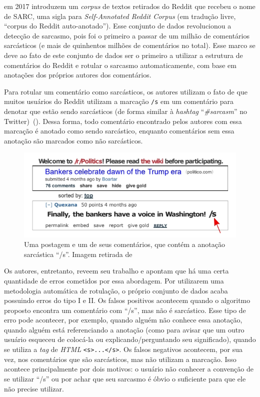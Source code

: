 \cite{khodak-etal:2017:sarc} em 2017 introduzem um \textit{corpus} de textos
retirados do Reddit que recebeu o nome de SARC, uma sigla para
\textit{Self-Annotated Reddit Corpus} (em tradução livre, ``corpus do Reddit
auto-anotado''). Esse conjunto de dados revolucionou a detecção de sarcasmo,
pois foi o primeiro a passar de um milhão de comentários sarcásticos (e mais de
quinhentos milhões de comentários no total). Esse marco se deve ao fato de este
conjunto de dados ser o primeiro a utilizar a estrutura de comentários do Reddit
e rotular o sarcasmo automaticamente, com base em anotações dos próprios autores
dos comentários.

Para rotular um comentário como sarcásticos, os autores utilizam o fato de que
muitos usuários do Reddit utilizam a marcação \texttt{/s} em um comentário para
denotar que estão sendo sarcásticos (de forma similar à \textit{hashtag}
``\textit{\#sarcasm}'' no Twitter)~(\cite{what-does-s-mean}). Dessa forma, todo
comentário encontrado pelos autores com essa marcação é anotado como sendo
sarcástico, enquanto comentários sem essa anotação são marcados como não
sarcásticos.

\begin{figure}[h]
\centering
\includegraphics[scale=0.7]{Res/sarc-img1.jpg}
\caption{Uma postagem e um de seus comentários, que contém a anotação sarcástica
``/s''. Imagem retirada de \cite{khodak-etal:2017:sarc}}
\label{sarc-img1.jpg}
\end{figure}

Os autores, entretanto, reveem seu trabalho e apontam que há uma certa
quantidade de erros cometidos por essa abordagem. Por utilizarem uma metodologia
automática de rotulação, o próprio conjunto de dados acaba possuindo erros do
tipo I e II. Os falsos positivos acontecem quando o algoritmo proposto encontra
um comentário com ``/s'', mas não é sarcástico. Esse tipo de erro pode
acontecer, por exemplo, quando alguém não conhece essa anotação, quando alguém
está referenciando a anotação (como para avisar que um outro usuário esqueceu de
colocá-la ou explicando/perguntando seu significado), quando se utiliza a
\textit{tag} de \textit{HTML} \texttt{<s>...</s>}. Os falsos negativos
acontecem, por sua vez, nos comentários que são sarcásticos, mas não utilizam a
marcação. Isso acontece principalmente por dois motivos: o usuário não conhecer
a convenção de se utilizar ``/s'' ou por achar que seu sarcasmo é óbvio o
suficiente para que ele não precise utilizar.

